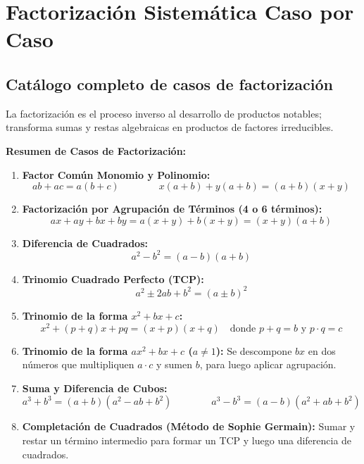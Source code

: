 \documentclass[12pt, letterpaper]{article}
\begin{document}

\section{Factorización Sistemática Caso por Caso}

\subsection{Catálogo completo de casos de factorización}

La factorización es el proceso inverso al desarrollo de productos notables; transforma sumas y restas algebraicas en productos de factores irreducibles.

\begin{cuadroteoria}
      \textbf{Resumen de Casos de Factorización:}
      \begin{enumerate}[leftmargin=*]
            \item \textbf{Factor Común Monomio y Polinomio:}
                  $$ab + ac = a(b + c) \qquad\qquad x(a + b) + y(a + b) = (a + b)(x + y)$$
            \item \textbf{Factorización por Agrupación de Términos (4 o 6 términos):}
                  $$ax + ay + bx + by = a(x + y) + b(x + y) = (x + y)(a + b)$$
            \item \textbf{Diferencia de Cuadrados:}
                  $$a^2 - b^2 = (a - b)(a + b)$$
            \item \textbf{Trinomio Cuadrado Perfecto (TCP):}
                  $$a^2 \pm 2ab + b^2 = (a \pm b)^2$$
            \item \textbf{Trinomio de la forma $x^2 + bx + c$:}
                  $$x^2 + (p + q)x + pq = (x + p)(x + q) \quad \text{donde } p+q = b \text{ y } p \cdot q = c$$
            \item \textbf{Trinomio de la forma $ax^2 + bx + c$ ($a \neq 1$):}
                  Se descompone $bx$ en dos números que multipliquen $a \cdot c$ y sumen $b$, para luego aplicar agrupación.
            \item \textbf{Suma y Diferencia de Cubos:}
                  $$a^3 + b^3 = (a + b)(a^2 - ab + b^2) \qquad\qquad a^3 - b^3 = (a - b)(a^2 + ab + b^2)$$
            \item \textbf{Completación de Cuadrados (Método de Sophie Germain):}
                  Sumar y restar un término intermedio para formar un TCP y luego una diferencia de cuadrados.
      \end{enumerate}
\end{cuadroteoria}
\end{document}
